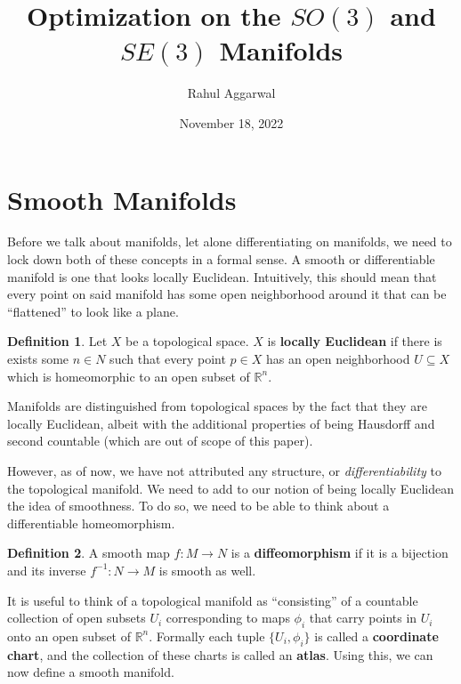 \documentclass[reqno]{amsart}
\title{Optimization on the $SO(3)$ and $SE(3)$ Manifolds}
\author{Rahul Aggarwal}
\date{November 18, 2022}
\theoremstyle{definition}
\newtheorem{defn}{Definition}[section]
\numberwithin{equation}{section}
\begin{document}
\begin{abstract}

\end{abstract}

\maketitle

\tableofcontents

\section{Smooth Manifolds}

Before we talk about manifolds, let alone differentiating on manifolds, we need to lock down both of these concepts in a formal sense.
A smooth or differentiable manifold is one that looks locally Euclidean. Intuitively, this should mean that every point on said manifold has some open neighborhood around it that can be ``flattened'' to look like a plane.

\begin{defn}
    Let $X$ be a topological space. $X$ is \textbf{locally Euclidean} if there is exists some $n \in N$ such that every point $p \in X$ has an open neighborhood $U \subseteq X$ which is homeomorphic to an open subset of $\mathbb{R}^n$.
\end{defn}

Manifolds are distinguished from topological spaces by the fact that they are locally Euclidean, albeit with the additional properties of being Hausdorff and second countable (which are out of scope of this paper).

However, as of now, we have not attributed any structure, or \textit{differentiability} to the topological manifold. We need to add to our notion of being locally Euclidean the idea of smoothness. To do so, we need to be able to think about a differentiable homeomorphism.

\begin{defn}
    A smooth map $f: M \to N$ is a \textbf{diffeomorphism} if it is a bijection and its inverse $f^{-1}: N \to M$ is smooth as well.
\end{defn}

It is useful to think of a topological manifold as ``consisting'' of a countable collection of open subsets $U_i$ corresponding to maps $\phi_i$ that carry points in $U_i$ onto an open subset of $\mathbb{R}^n$. Formally each tuple $\{U_i, \phi_i\}$ is called a \textbf{coordinate chart}, and the collection of these charts is called an \textbf{atlas}. Using this, we can now define a smooth manifold.
\end{document}
